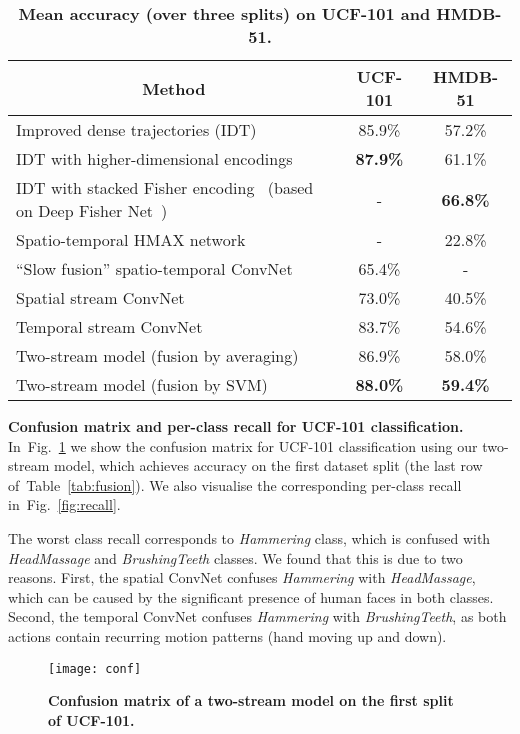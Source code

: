 \documentclass{article} \usepackage{nips14submit_e,times}
\newcommand{\figref}[1]{Fig.~\ref{#1}}
\newcommand{\tblref}[1]{Table~\ref{#1}}
\begin{document}
\begin{table}[ht]
\small
\centering
\caption{\textbf{Mean accuracy (over three splits) on UCF-101 and HMDB-51.}
}
\begin{tabular}{|l|c|c|} \hline
\multicolumn{1}{|c|}{Method} & UCF-101 & HMDB-51 \\ \hline
Improved dense trajectories (IDT)~\cite{Wang13b,Wang13c} & 85.9\% & 57.2\% \\ \hline
IDT with higher-dimensional encodings~\cite{Peng14} & \textbf{87.9\%} & 61.1\% \\ \hline
IDT with stacked Fisher encoding~\cite{Peng14a} (based on Deep Fisher Net~\cite{Simonyan13b}) & - & \textbf{66.8\%} \\ \hline
Spatio-temporal HMAX network~\cite{Kuehne11,Jhuang07} & - & 22.8\% \\ \hline
``Slow fusion'' spatio-temporal ConvNet~\cite{Karpathy14} & 65.4\% & - \\ \hline\hline
Spatial stream ConvNet & 73.0\% & 40.5\% \\ \hline
Temporal stream ConvNet & 83.7\% & 54.6\% \\ \hline
Two-stream model (fusion by averaging) & 86.9\% & 58.0\% \\ \hline
Two-stream model (fusion by SVM) & \textbf{88.0\%} & \textbf{59.4\%} \\ \hline
\end{tabular}
\label{tab:comp_SOA}
\end{table}


\noindent\textbf{Confusion matrix and per-class recall for UCF-101 classification.}
In~\figref{fig:conf} we show the confusion matrix for UCF-101 classification using our two-stream model, which achieves  accuracy on the first dataset split (the last row of~\tblref{tab:fusion}).
We also visualise the corresponding per-class recall in~\figref{fig:recall}.

The worst class recall corresponds to \emph{Hammering} class, which is confused with \emph{HeadMassage} and \emph{BrushingTeeth} classes.
We found that this is due to two reasons. First, the spatial ConvNet confuses \emph{Hammering} with \emph{HeadMassage}, which can be caused by
the significant presence of human faces in both classes. Second, the temporal ConvNet confuses \emph{Hammering} with \emph{BrushingTeeth}, as
both actions contain recurring motion patterns (hand moving up and down).

\begin{figure}[htb]
\centering
\texttt{[image: conf]}
\caption{\textbf{Confusion matrix of a two-stream model on the first split of UCF-101.} 
}
\label{fig:conf}
\end{figure}
\end{document}
